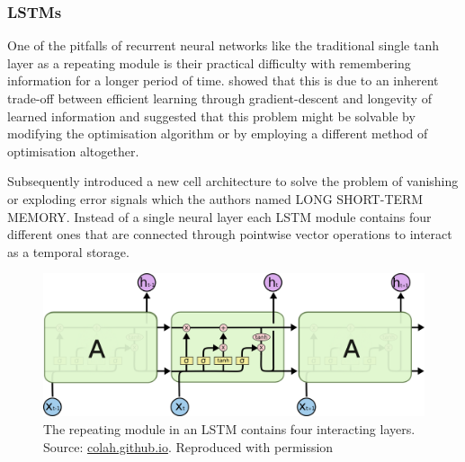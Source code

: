 










\subsubsection{LSTMs}

One of the pitfalls of recurrent neural networks like the traditional single tanh layer as a repeating module is their practical difficulty with remembering information for a longer period of time. \cite{279181} showed that this is due to an inherent trade-off between efficient learning through gradient-descent and longevity of learned information and suggested that this problem might be solvable by modifying the optimisation algorithm or by employing a different method of optimisation altogether.

 Subsequently \cite{Hochreiter:1997:LSM:1246443.1246450} introduced a new cell architecture to solve the problem of vanishing or exploding error signals which the authors named LONG SHORT-TERM MEMORY. 
 Instead of a single neural layer each LSTM module contains four different ones that are connected through pointwise vector operations to interact  as a temporal storage.
 
\begin{figure}[h]
    \centering
	\includegraphics[width=.95\textwidth]{./images/illustrations/LSTM3}
    \caption{The repeating module in an LSTM contains four interacting layers. Source: \url{colah.github.io}. Reproduced with permission}
    \label{fig:mesh1}
\end{figure}

